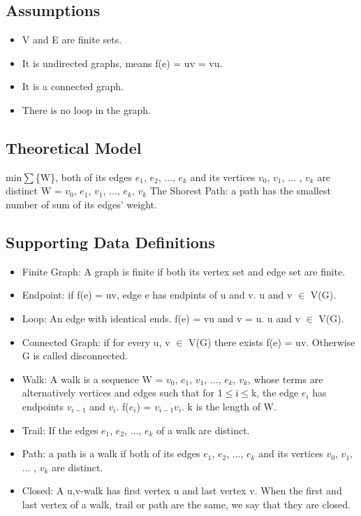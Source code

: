 \documentclass[12pt]{article}
\begin{document}
\subsection{Assumptions}
\begin{itemize}
    \item V and E are finite sets.
    \item It is undirected graphs, means f(e) = uv = vu.
    \item It is a connected graph.
    \item There is no loop in the graph.
\end{itemize}

\subsection{Theoretical Model}
min$\sum$\{W\}, both of its edges $e_1$, $e_2$, $...$, $e_k$ and its vertices $v_0$, $v_1$, $...$ , $v_k$ are distinct
W = {$v_0$, $e_1$, $v_1$, $...$, $e_k$, $v_k$} 
The Shorest Path: a path has the smallest number of sum of its edges' weight.

\subsection{Supporting Data Definitions}
\begin{itemize}
    \item Finite Graph: A graph is finite if both its vertex set and edge set are finite.
    \item Endpoint: if f(e) = uv, edge e has endpints of u and v. u and v $\in$  V(G).
    \item Loop: An edge with identical ends. f(e) = vu and v = u. u and v $\in$  V(G).
    \item Connected Graph: if for every u, v $\in$  V(G) there exists f(e) = uv. Otherwise G is called disconnected.
    \item Walk: A walk is a sequence W = {$v_0$, $e_1$, $v_1$, $...$, $e_k$, $v_k$}, whose terms are alternatively vertices 
    and edges such that for 1$\le$i$\le$k, the edge $e_i$ has endpoints $v_{i-1}$ and $v_i$. f($e_i$) = $v_{i-1}v_i$. k is the length of W.
    \item Trail: If the edges $e_1$, $e_2$, $...$, $e_k$ of a walk are distinct.
    \item Path: a path is a walk if both of its edges $e_1$, $e_2$, $...$, $e_k$ and its vertices $v_0$, $v_1$, $...$ , $v_k$ are distinct.
    \item Closed: A u,v-walk has first vertex u and last vertex v. 
    When the first and last vertex of a walk, trail or path are the same, we say that they are closed. 
\end{itemize}
\end{document}
